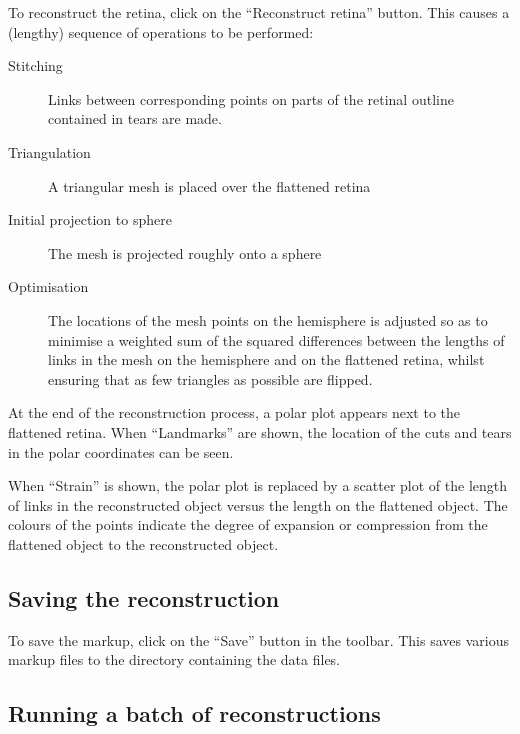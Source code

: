 \documentclass{article}
\begin{document}
To reconstruct the retina, click on the ``Reconstruct retina''
button. This causes a (lengthy) sequence of operations to be performed:
\begin{description}
\item[Stitching] Links between corresponding points on parts of the retinal
  outline  contained in tears are made.
\item[Triangulation] A triangular mesh is placed over the flattened retina
\item[Initial projection to sphere ] The mesh is projected roughly
  onto a sphere
\item[Optimisation] The locations of the mesh points on the hemisphere
  is adjusted so as to minimise a weighted sum of the squared
  differences between the lengths of links in the mesh on the
  hemisphere and on the flattened retina, whilst ensuring that as few
  triangles as possible are flipped.
\end{description}

At the end of the reconstruction process, a polar plot appears next to
the flattened retina. When ``Landmarks'' are shown, the location of
the cuts and tears in the polar coordinates can be seen.

When ``Strain'' is shown, the polar plot is replaced by a scatter plot of the
length of links in the reconstructed object versus the length on the
flattened object. The colours of the points indicate the degree of
expansion or compression from the flattened object to the
reconstructed object.

\subsection{Saving the reconstruction}
\label{manual:sec:saving-reconstr}

To save the markup, click on the ``Save'' button in the toolbar. This
saves various markup files to the directory containing the data files.

\subsection{Running a batch of reconstructions}
\label{manual:sec:runn-batch-reconstr}
\end{document}
